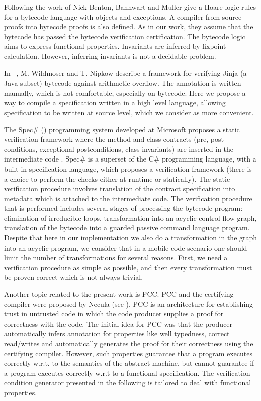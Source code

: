 Following the work of Nick Benton, Bannwart and Muller \cite{BM05plb} give  a Hoare logic rules
for a bytecode language with objects and  exceptions. A compiler from source proofs into bytecode proofs is also defined. 
As in our work, they assume that the bytecode has passed the bytecode verification certification. The bytecode logic aims to 
express functional properties. Invariants are inferred by fixpoint calculation.
However, inferring invariants is not a decidable problem.


In ~\cite{WildmoserN-ESOP05}, M. Wildmoser and T. Nipkow describe a framework for verifying Jinja (a Java subset) bytecode 
against arithmetic overflow.  The annotation is written manually, which is not comfortable, especially on bytecode. 
Here we propose a way to compile a specification written in a high level language, allowing specification to be written
 at source level, which we consider as more convenient. 

 The Spec\# (\cite{BLS04sp}) programming system developed at Microsoft proposes a static verification framework where 
 the method and class contracts  (pre, post conditions, exceptional postconditions, class invariants) are inserted in the intermediate code . 
 Spec\# is a superset of the C\# programming language, with a built-in  specification language, 
 which proposes a verification framework (there is a choice to perform the checks either at runtime or statically). 
 The static verification procedure  involves translation of the contract specification into metadata which is attached to the intermediate code. 
 The verification procedure \cite{leinoWPUP} that is performed includes several stages of processing the bytecode program:  
 elimination of irreducible loops, transformation into an acyclic control flow graph,
 translation of the bytecode into a guarded passive command language program. Despite that here in our implementation we also
 do a transformation in the graph into an acyclic program, we consider that in a mobile code scenario one should limit the number of transformations for several reasons.
 First, we need a verification procedure as simple as possible, and then every transformation must be proven correct which is not always trivial.      

Another topic related to the present work is PCC.
 PCC and the certifying compiler were proposed by Necula (see \cite{Necula97,ComNec,DesNecLee98}). PCC is an architecture for establishing trust in untrusted code 
in which the code producer supplies a proof for correctness with the code. 
The initial idea for PCC  was that the producer automatically infers annotation for properties like well typedness, 
correct read/writes and automatically generates the proof for their correctness using the certifying compiler. 
However, such properties guarantee that a program executes correctly w.r.t. to the semantics of the 
abstract machine, but cannot guarantee if a program executes correctly w.r.t to a functional specification.
The verification condition generator presented in the following is tailored to deal with functional properties.


 


 
